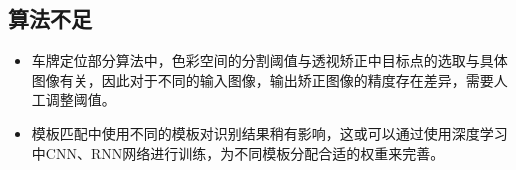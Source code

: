 \documentclass[utf8,a4paper]{ctexart}
\begin{document}
\subsection{算法不足}
\begin{itemize}
    \item 车牌定位部分算法中，色彩空间的分割阈值与透视矫正中目标点的选取与具体图像有关，因此对于不同的输入图像，输出矫正图像的精度存在差异，需要人工调整阈值。
    \item 模板匹配中使用不同的模板对识别结果稍有影响，这或可以通过使用深度学习中CNN、RNN网络进行训练，为不同模板分配合适的权重来完善。
\end{itemize}


\nocite{anagnostopoulos2006license}
\nocite{ibrahim2014license}


\newpage
\end{document}
